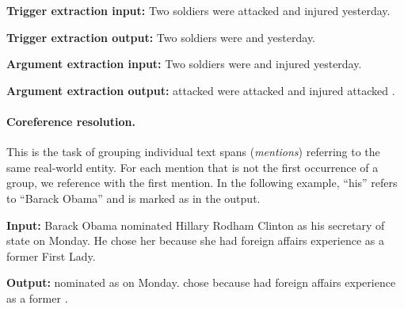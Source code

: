 \begin{footnotesize}
\begin{customquote}
    \quotespacestart
    \textbf{Trigger extraction input:}
    \nohyphens{Two soldiers were attacked and injured yesterday.} 
    
    \textbf{Trigger extraction output:}
    \nohyphens{Two soldiers were \entitybegin {} \separator {} \entityend and \entitybegin {} \separator {} \entityend yesterday.}
    
    \textbf{Argument extraction input:}
    \nohyphens{Two soldiers were \entitybegin {} \separator {} \entityend and injured yesterday.}
    
    \textbf{Argument extraction output:}
    \entitybegin {} \separator {} \separator {} \equals attacked \entityend were attacked and injured \entitybegin {} \separator {} \separator {} \equals attacked \entityend.
\quotespaceend
\end{customquote}
\end{footnotesize}

\paragraph{Coreference resolution.}
This is the task of grouping individual text spans (\emph{mentions}) referring to the same real-world entity. 
For each mention that is not the first occurrence of a group, we reference with the first mention. In the following example, ``his'' refers to ``Barack Obama'' and is marked as \entitybegin {} \separator {} \entityend in the output.

\begin{footnotesize}
\begin{customquote}
\quotespacestart
    \textbf{Input:}
    Barack Obama nominated Hillary Rodham Clinton as his secretary of state on Monday. He chose her because she had foreign affairs experience as a former First Lady.
    
    \textbf{Output:}
   \nohyphens{\entitybegin {} \entityend nominated \entitybegin {} \entityend as \entitybegin {} \separator {} \entityend \entitybegin {} \separator {} \entityend on Monday.	\entitybegin {} \separator {} \entityend chose \entitybegin{} \separator {} \entityend because \entitybegin {} \separator {} \entityend had foreign affairs	experience as a	former \entitybegin {} \separator {} \entityend.}
\quotespaceend
\end{customquote}
\end{footnotesize}

